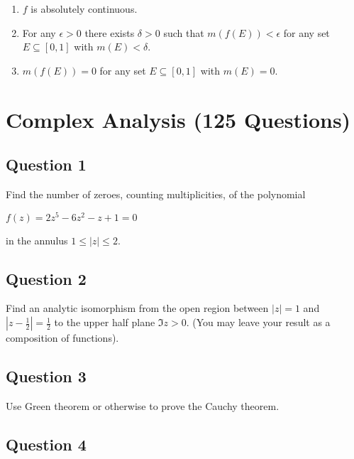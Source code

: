 \documentclass[12pt]{article}
\begin{document}
\begin{enumerate}
\def\labelenumi{\arabic{enumi}.}
\item
  \(f\) is absolutely continuous.
\item
  For any \(\epsilon > 0\) there exists \(\delta > 0\) such that
  \(m(f(E)) < \epsilon\) for any set \(E\subseteq [0,1]\) with
  \(m(E) < \delta\).
\item
  \(m(f(E)) = 0\) for any set \(E \subseteq [0,1]\) with \(m(E)=0\).
\end{enumerate}

\hypertarget{complex-analysis-125-questions}{%
\section{Complex Analysis (125
Questions)}\label{complex-analysis-125-questions}}

\hypertarget{question-1-2}{%
\subsection{Question 1}\label{question-1-2}}

Find the number of zeroes, counting multiplicities, of the polynomial

\(f(z) = 2z^5 - 6z^2 - z + 1 = 0\)

in the annulus \(1 \leq |z| \leq 2\).

\hypertarget{question-2-2}{%
\subsection{Question 2}\label{question-2-2}}

Find an analytic isomorphism from the open region between \(|z| = 1\)
and \(|z -\frac 1 2| =\frac 1 2\) to the upper half plane \(\Im z > 0\).
(You may leave your result as a composition of functions).

\hypertarget{question-3-2}{%
\subsection{Question 3}\label{question-3-2}}

Use Green theorem or otherwise to prove the Cauchy theorem.

\hypertarget{question-4-2}{%
\subsection{Question 4}\label{question-4-2}}
\end{document}
